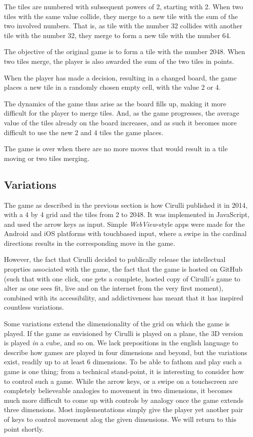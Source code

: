 \documentclass[a4paper, 12pt]{article}
\begin{document}
The tiles are numbered with subsequent powers of 2, starting with
2. When two tiles with the same value collide, they merge to a new
tile with the sum of the two involved numbers. That is, as tile with
the number 32 collides with another tile with the number 32, they
merge to form a new tile with the number 64.

The objective of the original game is to form a tile with the number 2048. When
two tiles merge, the player is also awarded the sum of the two tiles
in points.

When the player has made a decision, resulting in a changed board, the game places a new tile in a randomly
chosen empty cell, with the value 2 or 4.

The dynamics of the game thus arise as the board fills up, making it
more difficult for the player to merge tiles. And, as the game
progresses, the average value of the tiles already on the board
increases, and as such it becomes more difficult to use the new 2 and
4 tiles the game places.

The game is over when there are no more moves that would result in a
tile moving or two tiles merging.

\subsection{Variations}

The game as described in the previous section is how Cirulli published
it in 2014, with a 4 by 4 grid and the tiles from 2 to 2048. It was
implemented in JavaScript, and used the arrow keys as input. Simple
\emph{WebView}-style apps were made for the Android and iOS platforms
with touchbased input, where a swipe in the cardinal directions
results in the corresponding move in the game.

However, the fact that Cirulli decided to publically release the
intellectual proprties associated with the game, the fact that the
game is hosted on GitHub (such that with one click, one gets a
complete, hosted copy of Cirulli's game to alter as one sees fit, live
and on the internet from the very first moment), combined with its
accessibility, and addictiveness has meant that it has inspired
countless variations.

Some variations extend the dimensionality of the grid on which the
game is played. If the game as envisioned by Cirulli is played on a
plane, the 3D version is played \emph{in} a cube, and so on. We lack
prepositions in the english language to describe how games are played
in four dimensions and beyond, but the variations exist, readily up to
at least 6 dimensions. To be able to fathom and play such a game is
one thing; from a technical stand-point, it is interesting to consider
how to control such a game. While the arrow keys, or a swipe on a
touchscreen are completely believeable analogies to movement in two
dimensions, it becomes much more difficult to come up with controls by
analogy once the game extends three dimensions. Most implementations
simply give the player yet another pair of keys to control movement
alog the given dimensions. We will return to this point shortly.
\end{document}
